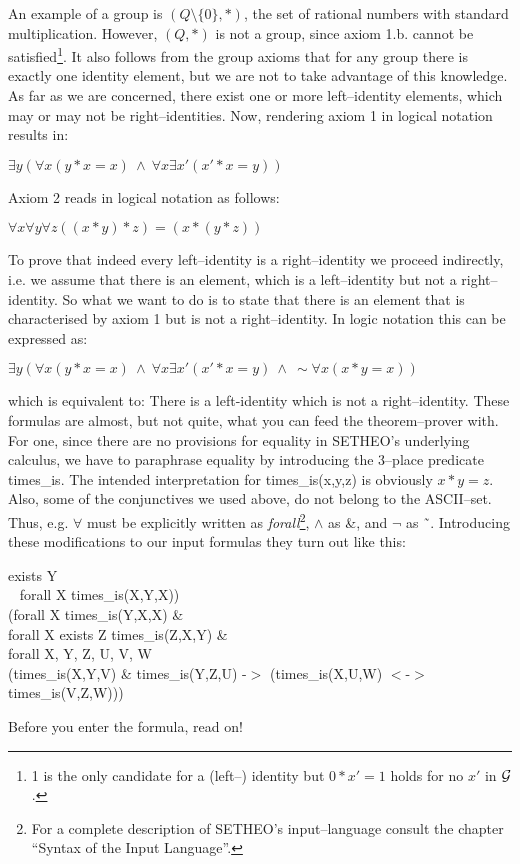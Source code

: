 An example of a group is $(Q\setminus \{0\},*)$, the set of rational numbers with
standard multiplication. However, $(Q,*)$ is not a group, since axiom 1.b. cannot
be satisfied\footnote{1 is the only candidate for a (left--) identity but
$0 * x' = 1$ holds for no $x'$ in $\cal G$.}.
It also follows from the group axioms that  for any group there is exactly
one identity element, but we are not to take advantage of this knowledge.
As far as we are concerned, there
exist one or more left--identity elements, which may or may not be right--identities.
Now, rendering axiom 1 in logical notation results in:
\begin{center}
	$\exists y (\forall x  (y * x = x) \:\wedge\: \forall x  \exists x' (x' * x = y))$
\end{center} 
Axiom 2 reads in logical notation as follows:
\begin{center}
	$\forall x \forall y \forall z  ((x * y) * z) = (x * (y * z))$
\end{center} 
To prove that indeed every left--identity is a right--identity we proceed
indirectly, i.e. we assume that there is an element, which is a left--identity 
but not a right--identity.
So what we want to do is to state that there is an element that is characterised by axiom 1
but is not a right--identity.
In logic notation this can be expressed as:
\begin{center}
	$\exists y (\forall x  (y * x = x) \:\wedge\: \forall x  \exists x' (x' * x = y) \:\wedge\:  \sim \forall x  (x * y = x))$
\end{center} 
which is equivalent to: There is a left-identity which is not a right--identity.
These formulas are almost, but not quite, what you can feed the theorem--prover with.
For one, since there are no provisions for equality in SETHEO's underlying calculus,
we have to paraphrase equality by introducing the 3--place predicate times\_is. The intended
interpretation for times\_is(x,y,z) is obviously $x * y = z$. Also, some of the conjunctives
we used above, do not belong to the ASCII--set. Thus, e.g. $\forall$ must be explicitly
written as {\it forall\/}\footnote{For a complete description of SETHEO's input--language consult
the chapter ``Syntax of the Input Language''.},
$\wedge$ as \&, and $\neg$ as \~\ .
Introducing these modifications to our input formulas they
turn out like this:
\\
\begin{tabbing}
exists Y \= \\
          \> ~ forall X times\_is(X,Y,X)) \\
          \> (forall X  times\_is(Y,X,X) \& \\
          \> forall X exists Z times\_is(Z,X,Y) \& \\
forall X, Y, Z, U, V, W \\
          \>(times\_is(X,Y,V) \& times\_is(Y,Z,U) -$>$ (times\_is(X,U,W) $<$-$>$ times\_is(V,Z,W)))
\end{tabbing}
Before you enter the formula, read on!
\\
